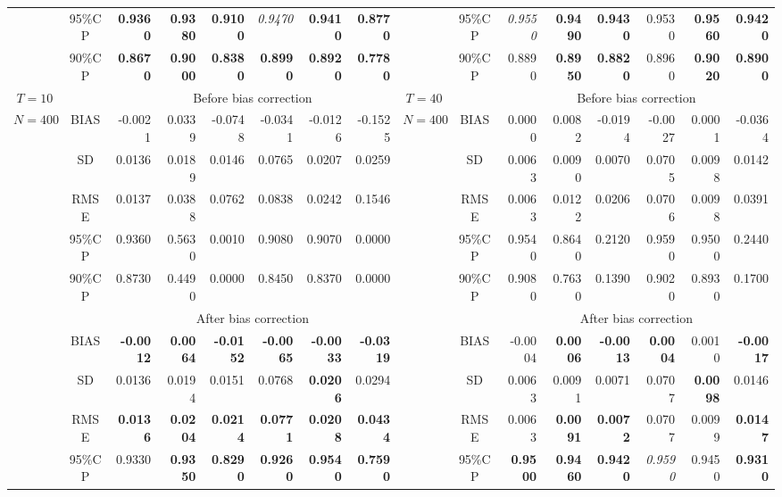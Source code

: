 \documentclass[11pt,a4paper]{article}
\begin{document}
\begin{landscape}
\begin{table}[p]
\begin{threeparttable}
{{\begin{tabular}{ccrrrrrrccrrrrrr}
 & 95\%CP & \textbf{0.9360} & \textbf{0.9380} & \textbf{0.9100} & \textit{0.9470} & \textbf{0.9410} & \textbf{0.8770} &  & 95\%CP & \textit{0.9550} & \textbf{0.9490} & \textbf{0.9430} & 0.9530 & \textbf{0.9560} & \textbf{0.9420} \\
 & 90\%CP & \textbf{0.8670} & \textbf{0.9000} & \textbf{0.8380} & \textbf{0.8990} & \textbf{0.8920} & \textbf{0.7780} &  & 90\%CP & 0.8890 & \textbf{0.8950} & \textbf{0.8820} & 0.8960 & \textbf{0.9020} & \textbf{0.8900} \\ \hline
$T=10$ &  & \multicolumn{6}{c}{Before bias correction} & $T=40$ &  & \multicolumn{6}{c}{Before bias correction} \\ \cline{3-8} \cline{11-16} 
$N=400$ & BIAS & -0.0021 & 0.0339 & -0.0748 & -0.0341 & -0.0126 & -0.1525 & $N=400$ & BIAS & 0.0000 & 0.0082 & -0.0194 & -0.0027 & 0.0001 & -0.0364 \\
 & SD & 0.0136 & 0.0189 & 0.0146 & 0.0765 & 0.0207 & 0.0259 &  & SD & 0.0063 & 0.0090 & 0.0070 & 0.0705 & 0.0098 & 0.0142 \\
 & RMSE & 0.0137 & 0.0388 & 0.0762 & 0.0838 & 0.0242 & 0.1546 &  & RMSE & 0.0063 & 0.0122 & 0.0206 & 0.0706 & 0.0098 & 0.0391 \\
 & 95\%CP & 0.9360 & 0.5630 & 0.0010 & 0.9080 & 0.9070 & 0.0000 &  & 95\%CP & 0.9540 & 0.8640 & 0.2120 & 0.9590 & 0.9500 & 0.2440 \\
 & 90\%CP & 0.8730 & 0.4490 & 0.0000 & 0.8450 & 0.8370 & 0.0000 &  & 90\%CP & 0.9080 & 0.7630 & 0.1390 & 0.9020 & 0.8930 & 0.1700 \\ \cline{2-8} \cline{10-16} 
 &  & \multicolumn{6}{c}{After bias correction} &  &  & \multicolumn{6}{c}{After bias correction} \\ \cline{3-8} \cline{11-16} 
 & BIAS & \textbf{-0.0012} & \textbf{0.0064} & \textbf{-0.0152} & \textbf{-0.0065} & \textbf{-0.0033} & \textbf{-0.0319} &  & BIAS & -0.0004 & \textbf{0.0006} & \textbf{-0.0013} & \textbf{0.0004} & 0.0010 & \textbf{-0.0017} \\
 & SD & 0.0136 & 0.0194 & 0.0151 & 0.0768 & \textbf{0.0206} & 0.0294 &  & SD & 0.0063 & 0.0091 & 0.0071 & 0.0707 & \textbf{0.0098} & 0.0146 \\
 & RMSE & \textbf{0.0136} & \textbf{0.0204} & \textbf{0.0214} & \textbf{0.0771} & \textbf{0.0208} & \textbf{0.0434} &  & RMSE & 0.0063 & \textbf{0.0091} & \textbf{0.0072} & 0.0707 & 0.0099 & \textbf{0.0147} \\
 & 95\%CP & 0.9330 & \textbf{0.9350} & \textbf{0.8290} & \textbf{0.9260} & \textbf{0.9540} & \textbf{0.7590} &  & 95\%CP & \textbf{0.9500} & \textbf{0.9460} & \textbf{0.9420} & \textit{0.9590} & 0.9450 & \textbf{0.9310} \\

\end{tabular}}}
\end{threeparttable}
\end{table}
\end{landscape}
\end{document}
